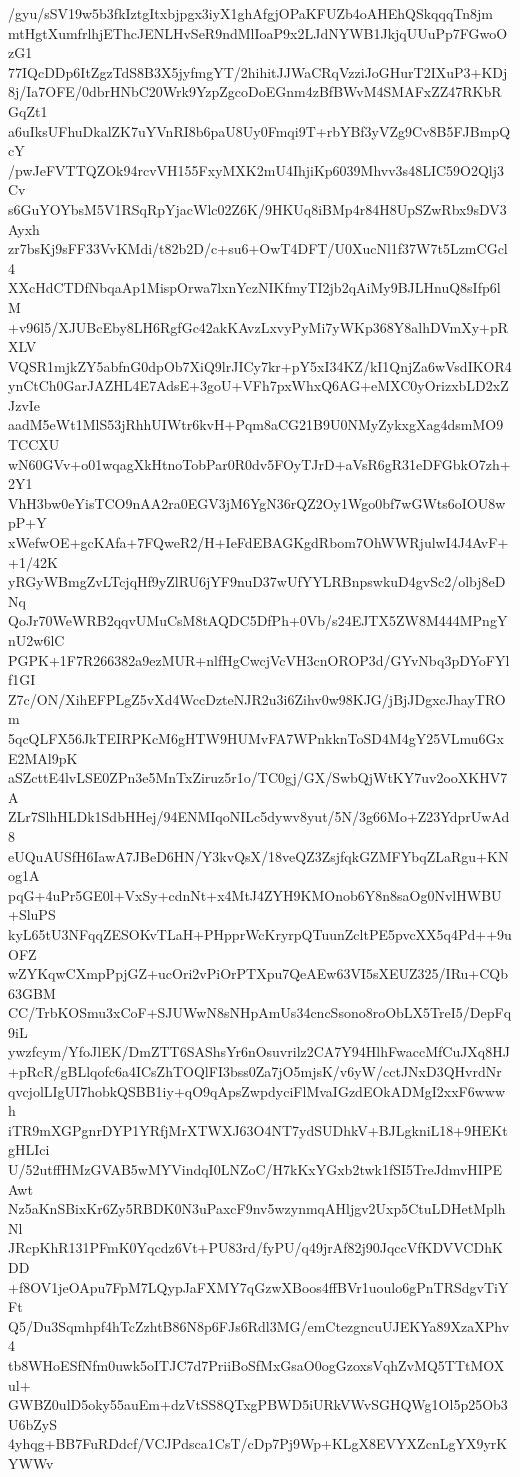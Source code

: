 /gyu/sSV19w5b3fkIztgItxbjpgx3iyX1ghAfgjOPaKFUZb4oAHEhQSkqqqTn8jm
mtHgtXumfrlhjEThcJENLHvSeR9ndMlIoaP9x2LJdNYWB1JkjqUUuPp7FGwoOzG1
77IQcDDp6ItZgzTdS8B3X5jyfmgYT/2hihitJJWaCRqVzziJoGHurT2IXuP3+KDj
8j/Ia7OFE/0dbrHNbC20Wrk9YzpZgcoDoEGnm4zBfBWvM4SMAFxZZ47RKbRGqZt1
a6uIksUFhuDkalZK7uYVnRI8b6paU8Uy0Fmqi9T+rbYBf3yVZg9Cv8B5FJBmpQcY
/pwJeFVTTQZOk94rcvVH155FxyMXK2mU4IhjiKp6039Mhvv3s48LIC59O2Qlj3Cv
s6GuYOYbsM5V1RSqRpYjacWlc02Z6K/9HKUq8iBMp4r84H8UpSZwRbx9sDV3Ayxh
zr7bsKj9sFF33VvKMdi/t82b2D/c+su6+OwT4DFT/U0XucNl1f37W7t5LzmCGcl4
XXcHdCTDfNbqaAp1MispOrwa7lxnYczNIKfmyTI2jb2qAiMy9BJLHnuQ8sIfp6lM
+v96l5/XJUBcEby8LH6RgfGc42akKAvzLxvyPyMi7yWKp368Y8alhDVmXy+pRXLV
VQSR1mjkZY5abfnG0dpOb7XiQ9lrJICy7kr+pY5xI34KZ/kI1QnjZa6wVsdIKOR4
ynCtCh0GarJAZHL4E7AdsE+3goU+VFh7pxWhxQ6AG+eMXC0yOrizxbLD2xZJzvIe
aadM5eWt1MlS53jRhhUIWtr6kvH+Pqm8aCG21B9U0NMyZykxgXag4dsmMO9TCCXU
wN60GVv+o01wqagXkHtnoTobPar0R0dv5FOyTJrD+aVsR6gR31eDFGbkO7zh+2Y1
VhH3bw0eYisTCO9nAA2ra0EGV3jM6YgN36rQZ2Oy1Wgo0bf7wGWts6oIOU8wpP+Y
xWefwOE+gcKAfa+7FQweR2/H+IeFdEBAGKgdRbom7OhWWRjulwI4J4AvF++1/42K
yRGyWBmgZvLTcjqHf9yZlRU6jYF9nuD37wUfYYLRBnpswkuD4gvSc2/olbj8eDNq
QoJr70WeWRB2qqvUMuCsM8tAQDC5DfPh+0Vb/s24EJTX5ZW8M444MPngYnU2w6lC
PGPK+1F7R266382a9ezMUR+nlfHgCwcjVcVH3cnOROP3d/GYvNbq3pDYoFYlf1GI
Z7c/ON/XihEFPLgZ5vXd4WccDzteNJR2u3i6Zihv0w98KJG/jBjJDgxcJhayTROm
5qcQLFX56JkTEIRPKcM6gHTW9HUMvFA7WPnkknToSD4M4gY25VLmu6GxE2MAl9pK
aSZcttE4lvLSE0ZPn3e5MnTxZiruz5r1o/TC0gj/GX/SwbQjWtKY7uv2ooXKHV7A
ZLr7SlhHLDk1SdbHHej/94ENMIqoNILc5dywv8yut/5N/3g66Mo+Z23YdprUwAd8
eUQuAUSfH6IawA7JBeD6HN/Y3kvQsX/18veQZ3ZsjfqkGZMFYbqZLaRgu+KNog1A
pqG+4uPr5GE0l+VxSy+cdnNt+x4MtJ4ZYH9KMOnob6Y8n8saOg0NvlHWBU+SluPS
kyL65tU3NFqqZESOKvTLaH+PHpprWcKryrpQTuunZcltPE5pvcXX5q4Pd++9uOFZ
wZYKqwCXmpPpjGZ+ucOri2vPiOrPTXpu7QeAEw63VI5sXEUZ325/IRu+CQb63GBM
CC/TrbKOSmu3xCoF+SJUWwN8sNHpAmUs34cncSsono8roObLX5TreI5/DepFq9iL
ywzfcym/YfoJlEK/DmZTT6SAShsYr6nOsuvrilz2CA7Y94HlhFwaccMfCuJXq8HJ
+pRcR/gBLlqofc6a4ICsZhTOQlFI3bss0Za7jO5mjsK/v6yW/cctJNxD3QHvrdNr
qvcjolLIgUI7hobkQSBB1iy+qO9qApsZwpdyciFlMvaIGzdEOkADMgI2xxF6wwwh
iTR9mXGPgnrDYP1YRfjMrXTWXJ63O4NT7ydSUDhkV+BJLgkniL18+9HEKtgHLIci
U/52utffHMzGVAB5wMYVindqI0LNZoC/H7kKxYGxb2twk1fSI5TreJdmvHIPEAwt
Nz5aKnSBixKr6Zy5RBDK0N3uPaxcF9nv5wzynmqAHljgv2Uxp5CtuLDHetMplhNl
JRcpKhR131PFmK0Yqcdz6Vt+PU83rd/fyPU/q49jrAf82j90JqccVfKDVVCDhKDD
+f8OV1jeOApu7FpM7LQypJaFXMY7qGzwXBoos4ffBVr1uoulo6gPnTRSdgvTiYFt
Q5/Du3Sqmhpf4hTcZzhtB86N8p6FJs6Rdl3MG/emCtezgncuUJEKYa89XzaXPhv4
tb8WHoESfNfm0uwk5oITJC7d7PriiBoSfMxGsaO0ogGzoxsVqhZvMQ5TTtMOXul+
GWBZ0ulD5oky55auEm+dzVtSS8QTxgPBWD5iURkVWvSGHQWg1Ol5p25Ob3U6bZyS
4yhqg+BB7FuRDdcf/VCJPdsca1CsT/cDp7Pj9Wp+KLgX8EVYXZcnLgYX9yrKYWWv
